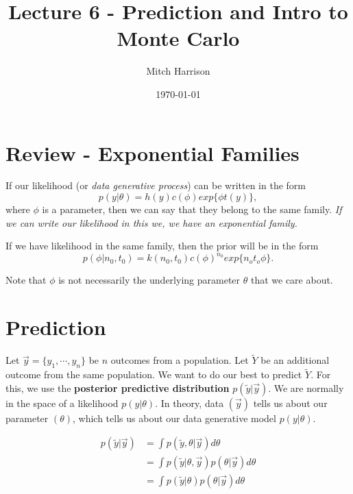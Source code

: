 \documentclass[titlepage, 12pt, leqno]{article}
\title{\Huge{Lecture 6 - Prediction and Intro to Monte Carlo}}
\author{\large{Mitch Harrison}}
\date{\today}
\begin{document}
\setlength{\parskip}{1\baselineskip}
\setlength{\parindent}{15pt}
\maketitle
\tableofcontents
\newpage


\section{Review - Exponential Families}

If our likelihood (or \textit{data generative process}) can be written in the
form 
\[
    p(y|\theta) = h(y)c(\phi )exp\{\phi t(y)\},
\]
where $\phi $ is a parameter, then we can say that they belong to the same family.
\textit{If we can write our likelihood in this we, we have an exponential family.}

If we have likelihood in the same family, then the prior will be in the form
\[
    p(\phi |n_{0},t_{0}) = k(n_{0},t_{0})c(\phi )^{n_{0}}exp\{n_{o}t_{o}\phi \}.
\]
\begin{note}
Note that $\phi $ is not necessarily the underlying parameter $\theta$ that we
care about.
\end{note}

\pagebreak
\section{Prediction}

Let $\vec y = \{y_{1}, \cdots , y_{n}\}$ be $n$ outcomes from a population. Let
$\tilde Y$ be an additional outcome from the same population. We want to do our
best to predict $\tilde Y$. For this, we use the \textbf{posterior predictive
distribution} $p(\tilde y | \vec y)$. We are normally in the space of a likelihood
$p(y|\theta)$. In theory, data $(\vec y)$ tells us about our parameter $(\theta)$,
which tells us about our data generative model $p(y|\theta)$. 

\begin{align*}
    p(\tilde y | \vec y) &= \int p(\tilde y, \theta|\vec y)d \theta \\
                         &= \int p(\tilde y|\theta,\vec y)p(\theta|\vec y)
                         d\theta \\
                         &= \int p(\tilde y|\theta)p(\theta|\vec y)d \theta \\
\end{align*}
\end{document}
